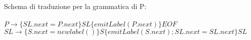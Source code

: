 \documentclass[a4paper, 26pt]{article}
\begin{document}
Schema di traduzione per la grammatica di P: \\ \\
$P \rightarrow \{SL.next = P.next\} SL \{emitLabel(P.next)\} EOF$ \\
$SL \rightarrow \{ S.next = newlabel() \} S \{ emitLabel(S.next); SL.next = SL.next\} SL $
\end{document}
